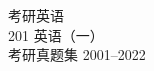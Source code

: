 

\pagestyle{empty}
\rule{0pt}{1pt}
\vfil
\begin{center}
	\heiti {}
	考研英语\\ 
		201  英语（一）\\
		考研真题集 2001--2022 \rule{0pt}{1.7em}
\end{center}

\vfil
